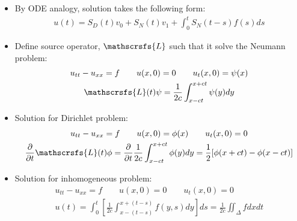 \documentclass[12pt, a4paper]{article}
\begin{document}
\begin{itemize}
    \item By ODE analogy, solution takes the following form:
    \begin{gather*}
        u(t) = S_D(t)v_0 + S_N(t)v_1 + \int_0^tS_N(t-s)f(s)ds 
    \end{gather*}
    \item Define source operator, $\mathscrsfs{L}$ such that it solve the Neumann problem:
    \begin{gather*}
        u_{tt} - u_{xx} = f \qquad u(x, 0) = 0\qquad u_t(x,0) = \psi(x) \\
        \mathscrsfs{L}(t)\psi= \frac{1}{2c}\int_{x-ct}^{x+ct}\psi(y)dy
    \end{gather*}
    \item Solution for Dirichlet problem:
    \begin{gather*}
        u_{tt} - u_{xx} = f \qquad u(x, 0) = \phi(x)\qquad u_t(x,0) = 0 \\
        \frac{\partial}{\partial t}\mathscrsfs{L}(t)\phi= \frac{\partial}{\partial t}\frac{1}{2c}\int_{x-ct}^{x+ct}\phi(y)dy = \frac{1}{2}[\phi(x +ct) -\phi(x -ct)]
    \end{gather*}
    \item Solution for inhomogeneous problem:
    \begin{gather*}
        u_{tt} - u_{xx} = f \qquad u(x, 0) = 0\qquad u_t(x,0) = 0 \\
        u(t)= \int_0^t \left[\frac{1}{2c}\int_{x-(t-s)}^{x+(t-s)}f(y, s)dy\right]ds = \frac{1}{2c}\iint_{\Delta}fdxdt
    \end{gather*}
\end{itemize}

\vspace{0.3em}
\end{document}
